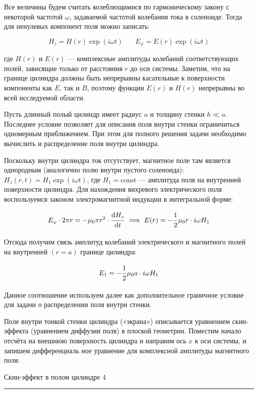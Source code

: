 \documentclass[12pt,a4paper]{scrartcl}
\begin{document}
	Все	величины будем считать колеблющимися по гармоническому закону с некоторой частотой $\omega$, задаваемой частотой колебания тока в соленоиде. Тогда для ненулевых компонент поля можно записать:
	
	$$H_z = H(r)\exp(i\omega t)\ \ \ \ \ \ \ \ E_\varphi = E(r)\exp(i\omega t)$$
	
	где $H(r)$ и $E(r)$ — комплексные амплитуды колебаний соответствующих полей, зависящие только от расстояния $r$ до оси системы. Заметим, что на границе цилиндра должны быть непрерывны касательные к поверхности компоненты как $E$, так и $B$, поэтому функции $E(r)$ и $H(r)$ непрерывны во всей исследуемой области.
	
	Пусть длинный полый цилиндр имеет радиус $a$ и толщину стенки $h \ll a$. Последнее условие позволяет для описания поля внутри стенки	ограничиться одномерным приближением. При этом для полного решения задачи необходимо вычислить и распределение поля внутри цилиндра.
	
	Поскольку внутри цилиндра ток отсутствует, магнитное поле там является однородным (аналогично полю внутри пустого соленоида): $H_z(r, t) = H_1 \exp(i \omega t)$, где $H_1 = \mathrm{const}$ — амплитуда поля на внутренней поверхности цилиндра. Для нахождения вихревого электрического поля воспользуемся законом электромагнитной индукции в интегральной форме:
	
	$$E_\varphi \cdot 2\pi r = -\mu_0 \pi r^2 \cdot \dfrac{\strut \mathrm{d} H_z}{\strut \mathrm{d} t} \implies E(r) = -\dfrac{\strut 1}{\strut 2} \mu_0 r \cdot i \omega H_1$$
	
	Отсюда получим связь амплитуд колебаний электрического и магнитного полей на внутренней $(r = a)$ границе цилиндра:
	
	$$E_1 = -\dfrac{\strut 1}{\strut 2} \mu_0 a \cdot i \omega H_1$$
	
	Данное соотношение используем далее как дополнительное граничное условие для задачи о распределении поля внутри стенки.
	
	Поле внутри тонкой стенки цилиндра («экрана») описывается уравнением скин-эффекта (уравнением диффузии поля) в плоской геометрии. Поместим начало отсчёта на внешнюю поверхность цилиндра и направим ось $x$ к оси системы, и запишем дифференциаль ное уравнение для комплексной амплитуды магнитного поля:
	\newpage
	
	
	\begin{flushleft}
	\footnotesize{Скин-эффект в полом цилиндре} \hspace{\fill} \footnotesize{4}
	\\[-0.3cm]\noindent\rule{\textwidth}{0.3pt}
\end{flushleft}
	
\end{document}
